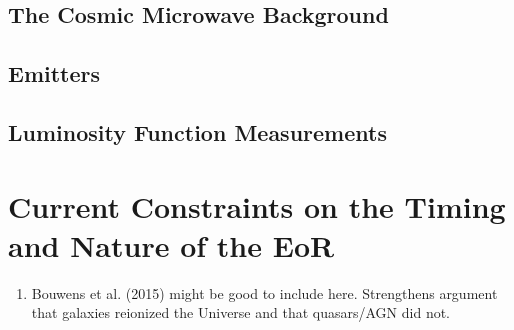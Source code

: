 \subsection{The Cosmic Microwave Background}
\subsection{\lya Emitters}
\subsection{Luminosity Function Measurements}

\section{Current Constraints on the Timing and Nature of the EoR}

\begin{enumerate}
\item Bouwens et al. (2015) might be good to include here. Strengthens argument that galaxies reionized the Universe and that quasars/AGN did not.
\end{enumerate}




